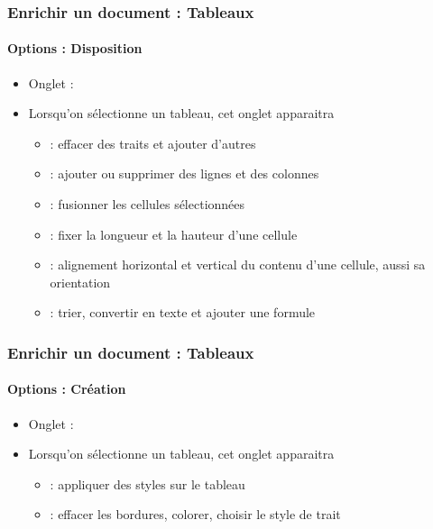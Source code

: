 \documentclass[xcolor=table]{beamer}
\begin{document}
\begin{frame}[t]
\frametitle{Enrichir un document : Tableaux}
\framesubtitle{Options : Disposition}


\begin{itemize}
	\item Onglet : 
	\item Lorsqu'on sélectionne un tableau, cet onglet apparaitra
	\begin{itemize}
		\item {} : effacer des traits et ajouter d'autres
		\item {} : ajouter ou supprimer des lignes et des colonnes
		\item {} : fusionner les cellules sélectionnées
		\item {} : fixer la longueur et la hauteur d'une cellule
		\item {} : alignement horizontal et vertical du contenu d'une cellule, aussi sa orientation
		\item {} : trier, convertir en texte et ajouter une formule
	\end{itemize}
\end{itemize}

\end{frame}

\begin{frame}[t]
\frametitle{Enrichir un document : Tableaux}
\framesubtitle{Options : Création}


\begin{itemize}
	\item Onglet : 
	\item Lorsqu'on sélectionne un tableau, cet onglet apparaitra
	\begin{itemize}
		\item {} : appliquer des styles sur le tableau
		\item {} : effacer les bordures, colorer, choisir le style de trait
	\end{itemize}
\end{itemize}

\end{frame}
\end{document}
